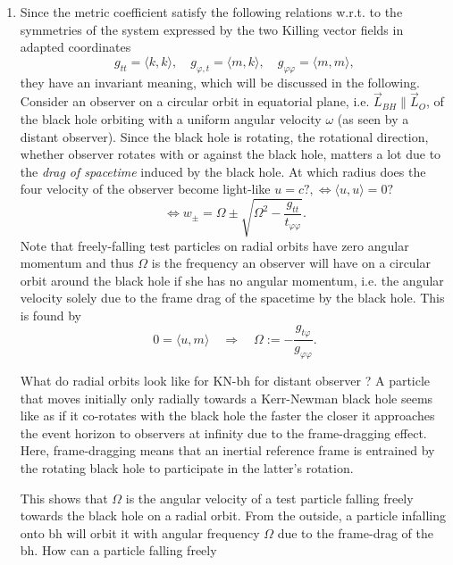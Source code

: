  \begin{enumerate}
\item 	Since the metric coefficient satisfy the following relations w.r.t. to the symmetries of the system expressed by the two Killing vector fields in adapted coordinates
	\begin{equation}
	g_{tt} = \langle k,k\rangle,\quad g_{\varphi,t} = \langle m, k\rangle, \quad g_{\varphi \varphi} = \langle m,m \rangle,
	\end{equation}
	they have an invariant meaning, which will be discussed in the following. Consider an observer on a circular orbit in equatorial plane, i.e. $\vec{L}_{BH} \parallel \vec{L}_O$, of the black hole orbiting with a uniform angular velocity $\omega$ (as seen by a distant observer). Since the black hole is rotating, the rotational direction, whether observer rotates with or against the black hole, matters a lot due to the \emph{drag of spacetime} induced by the black hole. At which radius does the four velocity of the observer become light-like $u =c?, \Leftrightarrow \langle u, u \rangle =0?$
	\begin{equation}
		\Leftrightarrow w_{\pm} = \Omega \pm \sqrt{\Omega^2 - \frac{g_{tt}}{t_{\varphi \varphi}}}.
	\end{equation}
	Note that freely-falling test particles on
	radial orbits have zero angular momentum and thus
	$\Omega$ is the frequency an observer will have on a circular orbit around the black hole if she has no angular momentum, i.e. the angular velocity solely due to the frame drag of the spacetime by the black hole. This is found by
	\begin{equation}
		0 = \langle u,m\rangle \quad \Rightarrow \quad \Omega := -\frac{g_{t\varphi}}{g_{\varphi \varphi}}.
	\end{equation}
	\begin{mybox}{What do radial orbits look like for KN-bh for distant observer ?}
		A particle that moves initially only radially towards a Kerr-Newman black hole seems like as if it
		co-rotates with the black hole the faster the closer it approaches the event horizon to observers at
		infinity due to the frame-dragging effect. Here, frame-dragging means that an inertial reference
		frame is entrained by the rotating black hole to participate in the latter’s rotation.
	\end{mybox}
	This shows that $\Omega$ is the angular
	velocity of a test particle falling freely towards the black hole on a radial
	orbit. From the outside, a particle infalling onto bh will orbit it with angular frequency $\Omega$ due to the frame-drag of the bh. How can a particle falling freely

\end{enumerate}
